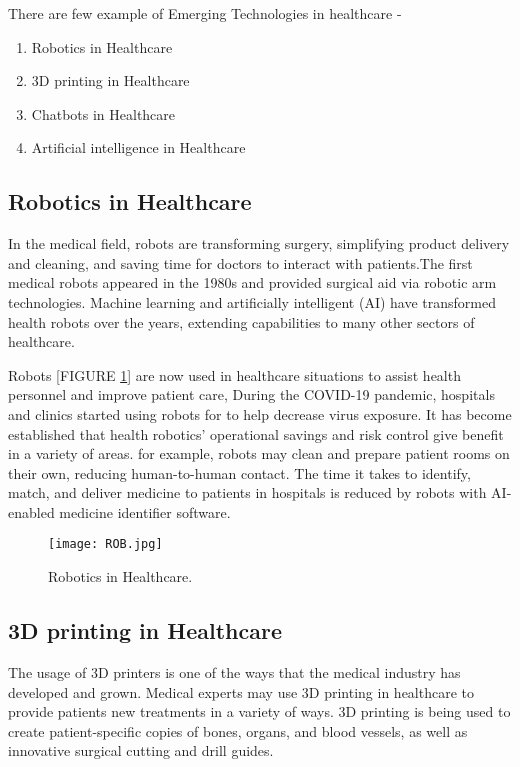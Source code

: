 \documentclass[12pt]{article}
\begin{document}
There are few example of Emerging Technologies  in healthcare -
\begin{enumerate}
  \item  Robotics in Healthcare
 \item 3D printing in Healthcare
\item Chatbots in Healthcare
  \item Artificial intelligence  in Healthcare
       
 \end{enumerate}
\clearpage
       
\subsection{Robotics in Healthcare}
In the medical field, robots are transforming surgery, simplifying product delivery and cleaning, and saving time for doctors to interact with patients.The first medical robots appeared in the 1980s and provided surgical aid via robotic arm technologies. Machine learning and artificially intelligent (AI) have transformed health robots over the years, extending capabilities to many other sectors of healthcare.

Robots [FIGURE \ref{fig_ROB}] are now used in healthcare situations to assist health personnel and improve patient care,   During the COVID-19 pandemic, hospitals and clinics started using robots for to help decrease virus exposure. It has become established that health robotics' operational savings and risk control give benefit in a variety of areas.
for example, robots may clean and prepare patient rooms on their own, reducing human-to-human contact. The time it takes to identify, match, and deliver medicine to patients in hospitals is reduced by robots with AI-enabled medicine identifier software. 
\begin{figure}[h]
\centering
\texttt{[image: ROB.jpg]}
\caption{Robotics in Healthcare.}
\label{fig_ROB}
\end{figure}
\clearpage
\subsection{3D printing in Healthcare}
The usage of 3D printers is one of the ways that the medical industry has developed and grown. Medical experts may use 3D printing in healthcare to provide patients new treatments in a variety of ways. 3D printing is being used to create patient-specific copies of bones, organs, and blood vessels, as well as innovative surgical cutting and drill guides.
\end{document}
